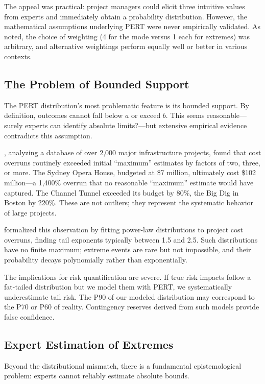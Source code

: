 \documentclass[12pt,a4paper]{article}
\theoremstyle{definition}
\theoremstyle{remark}
\begin{document}
The appeal was practical: project managers could elicit three intuitive values from experts and immediately obtain a probability distribution. However, the mathematical assumptions underlying PERT were never empirically validated. As \citet{Keefer1983} noted, the choice of weighting (4 for the mode versus 1 each for extremes) was arbitrary, and alternative weightings perform equally well or better in various contexts.

\subsection{The Problem of Bounded Support}

The PERT distribution's most problematic feature is its bounded support. By definition, outcomes cannot fall below $a$ or exceed $b$. This seems reasonable—surely experts can identify absolute limits?—but extensive empirical evidence contradicts this assumption.

\citet{Flyvbjerg2011}, analyzing a database of over 2,000 major infrastructure projects, found that cost overruns routinely exceeded initial ``maximum'' estimates by factors of two, three, or more. The Sydney Opera House, budgeted at \$7 million, ultimately cost \$102 million—a 1,400\% overrun that no reasonable ``maximum'' estimate would have captured. The Channel Tunnel exceeded its budget by 80\%, the Big Dig in Boston by 220\%. These are not outliers; they represent the systematic behavior of large projects.

\citet{Flyvbjerg2021} formalized this observation by fitting power-law distributions to project cost overruns, finding tail exponents typically between 1.5 and 2.5. Such distributions have no finite maximum; extreme events are rare but not impossible, and their probability decays polynomially rather than exponentially.

The implications for risk quantification are severe. If true risk impacts follow a fat-tailed distribution but we model them with PERT, we systematically underestimate tail risk. The P90 of our modeled distribution may correspond to the P70 or P60 of reality. Contingency reserves derived from such models provide false confidence.

\subsection{Expert Estimation of Extremes}

Beyond the distributional mismatch, there is a fundamental epistemological problem: experts cannot reliably estimate absolute bounds.
\end{document}
